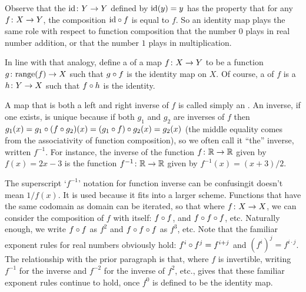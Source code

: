 Observe that the 
\( \mbox{$\mbox{id}\colon Y\to Y$} \) defined by
\( \mbox{id}(y)=y \) has the property that for any \( \mbox{$f\colon X\to Y$} \),
the composition \( \mbox{id}\mathbin\circ f \) is equal to \( f \).
So an identity map plays the same role with respect to function composition
that the number \( 0 \) plays in real number addition, or that the number 
\( 1 \) plays in multiplication.

In line with that analogy, define a
 of a map 
\( \mbox{$f\colon X\to Y$} \) to be a
function \( \mbox{$g\colon \text{range}(f)\to X$} \) such that \( g\mathbin\circ f \)
is the identity map on \( X \).
Of course, a  of \( f \) is a
\( \mbox{$h\colon Y\to X$} \) such that \( f\mathbin\circ h \) is the identity.

A map that is both a left and right inverse of \( f \)
is called simply an 
.
An inverse, if one exists, is unique because if both \( g_1 \) and
\( g_2 \) are inverses of \( f \) then
\( g_1(x)=g_1\mathbin\circ  (f\mathbin\circ g_2)(x)
         =(g_1\mathbin\circ f) \mathbin\circ g_2(x)
         =g_2(x) \)
(the middle equality comes from the associativity of function composition),
so we often call it ``the'' inverse, written \( f^{-1} \).
For instance, the inverse of the function \( \mbox{$f\colon \mathbb{R}\to \mathbb{R}$} \)
given by \( f(x)=2x-3 \) is the function \( \mbox{$f^{-1}\colon \mathbb{R}\to \mathbb{R}$} \)
given by \( f^{-1}(x)=(x+3)/2 \).

The superscript `\( f^{-1} \)' notation for function inverse can be 
confusing\Dash it doesn't mean \( 1/f(x) \).
It is used because it fits into a larger scheme.
Functions that have the same codomain as domain can be iterated,
so that where $\mbox{$f\colon X\to X$}$, we can consider
the composition of $f$ with itself: \( f\mathbin\circ f \), 
and \( f\mathbin\circ f\mathbin\circ f \), etc.
Naturally enough, we 
write $f\mathbin\circ f$ as \( f^2 \) and 
$f\mathbin\circ f\mathbin\circ f$ as \( f^3 \), etc.
Note that the familiar exponent rules for real numbers obviously hold:
\( f^i\mathbin\circ f^j=f^{i+j} \) and \( (f^i)^j=f^{i\cdot j} \).
The relationship with the prior paragraph is that, where \( f \) is invertible,
writing \( f^{-1} \) for the inverse
and \( f^{-2} \) for the inverse of \( f^2 \), etc., gives that
these familiar exponent rules continue to hold, once
\( f^0 \) is defined to be the identity map.

